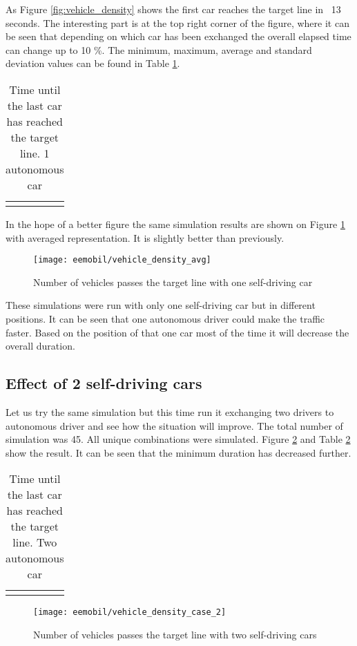 		As Figure \ref{fig:vehicle_density} shows the first car reaches the target line in ~13 seconds. The interesting part is at the top right corner of the figure, where it can be seen that depending on which car has been exchanged the overall elapsed time can change up to 10 \%. The minimum, maximum, average and standard deviation values can be found in Table \ref{tab:vehicle_density_minmaxavg_case1}.
		\begin{table}
			\begin{center}
				\begin{tabular}{ |c|c|c|c|}
					\hline
					\vehicledensitytable{1}
					\hline
				\end{tabular}
			\end{center}
			\caption{Time until the last car has reached the target line. 1 autonomous car}
			\label{tab:vehicle_density_minmaxavg_case1}
		\end{table}
		
		In the hope of a better figure the same simulation results are shown on Figure \ref{fig:vehicle_density_avg} with averaged representation. It is slightly better than previously.
		
		\begin{figure}
			\centering
			\texttt{[image: eemobil/vehicle\_density\_avg]}
			\caption{Number of vehicles passes the target line with one self-driving car}
			\label{fig:vehicle_density_avg}
		\end{figure}
		
		These simulations were run with only one self-driving car but in different positions. It can be seen that one autonomous driver could make the traffic faster. Based on the position of that one car most of the time it will decrease the overall duration.
		\subsection{Effect of 2 self-driving cars}
		Let us try the same simulation but this time run it exchanging two drivers to autonomous driver and see how the situation will improve. The total number of simulation was 45. All unique combinations were simulated. Figure \ref{fig:vehicle_density_case_2} and Table \ref{tab:vehicle_density_minmaxavg_case2} show the result.
		It can be seen that the minimum duration has decreased further.
		\begin{table}
			\begin{center}
				\begin{tabular}{ |c|c|c|c|}
					\hline
					\vehicledensitytable{2}
					\hline
				\end{tabular}
			\end{center}
			\caption{Time until the last car has reached the target line. Two autonomous car}
			\label{tab:vehicle_density_minmaxavg_case2}
		\end{table}
		\begin{figure}
			\centering
			\texttt{[image: eemobil/vehicle\_density\_case\_2]}
			\caption{Number of vehicles passes the target line with two self-driving cars}
			\label{fig:vehicle_density_case_2}
		\end{figure}

